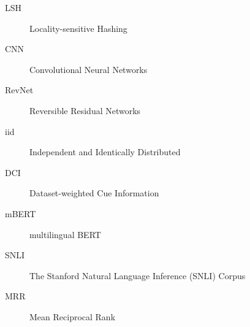\begin{description}
    \item[LSH] Locality-sensitive Hashing
    \item[CNN] Convolutional Neural Networks
    \item[RevNet] Reversible Residual Networks
    \item[iid] Independent and Identically Distributed
    \item[DCI] Dataset-weighted Cue Information
    \item[mBERT] multilingual BERT
    \item[SNLI] The Stanford Natural Language Inference (SNLI) Corpus
    \item[MRR] Mean Reciprocal Rank
\end{description}